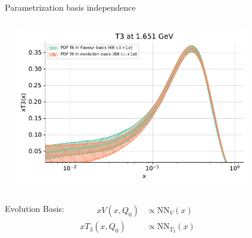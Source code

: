 \documentclass[aspectratio=169,9pt]{beamer}
\begin{document}
\begin{frame}{Parametrization basis independence}
\begin{columns}
\begin{column}[T]{0.48\textwidth}
        \end{column}
        \begin{column}[t]{0.48\textwidth}
        \vspace{0pt}%
	        \begin{center}
	            \includegraphics[width=0.8\textwidth]{flavour_evolution_T3} \\
	        \end{center}
        \end{column}
    \end{columns}
    \begin{columns}
		    Evolution Basis:
		    {\footnotesize
		    \begin{fleqn}
		    \begin{align*}
		       \qquad x V\left(x, Q_{0}\right) &\propto \mathrm{NN}_{V}(x)\\
		        x T_{3}\left(x, Q_{0}\right) &\propto \mathrm{NN}_{T_{3}}(x)
		    \end{align*}
		    \end{fleqn}
}
\end{columns}
\end{frame}
\end{document}
